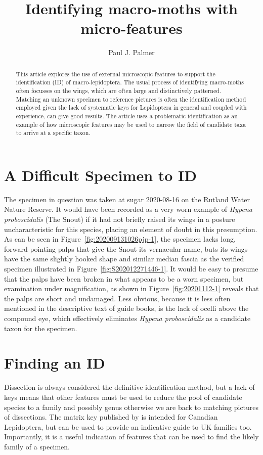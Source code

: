 \documentclass[]{article}
\title{Identifying macro-moths with micro-features}
\author{Paul J. Palmer}
\begin{document}
\maketitle

\begin{abstract}

This article explores the use of external microscopic features to support the identification (ID) of  macro-lepidoptera. The usual process of identifying macro-moths often focusses on the wings, which are often large and distinctively patterned. Matching an unknown specimen to reference pictures is often the identification method employed given the lack of systematic keys for Lepidoptera in general and coupled with experience, can give good results. The article uses a problematic identification as an example of how microscopic features may be used to narrow the field of candidate taxa to arrive at a specific taxon. 

\end{abstract}

\section*{A Difficult Specimen to ID}
The specimen in question was taken at sugar 2020-08-16 on the Rutland Water Nature Reserve. It would have been recorded as a very worn example of \textit{Hypena proboscidalis} (The Snout) if it had not briefly raised its wings in a posture uncharacteristic for this species, placing an element of doubt in this presumption. As can be seen in Figure~\ref{fig:202009131026pjp-1}, the specimen lacks long, forward pointing palps that give the Snout its vernacular name, buts its wings have the same slightly hooked shape  and similar median fascia as the verified specimen illustrated in  Figure~\ref{fig:S202012271446-1}.  It would be easy to presume that the palps have been broken in what appears to be a worn specimen, but examination under magnification, as shown in  Figure~\ref{fig:20201112-1} reveals that the palps are short and undamaged. Less obvious, because it is less often mentioned in the descriptive text of guide books, is the lack of ocelli above the compound eye,  which effectively eliminates \textit{Hypena proboscidalis} as a candidate taxon for the specimen.

\section*{Finding an ID}
Dissection is always considered the definitive identification method, but a lack of keys means that other features must be used to reduce the pool of candidate species to a family and possibly genus otherwise we are back to matching pictures of dissections.  The matrix key published by \citet{Dombroskie2011} is intended for Canadian Lepidoptera, but can be used to provide an indicative guide to UK families too. Importantly, it is a useful indication of features that can be used to find the likely family of a specimen.
\end{document}
